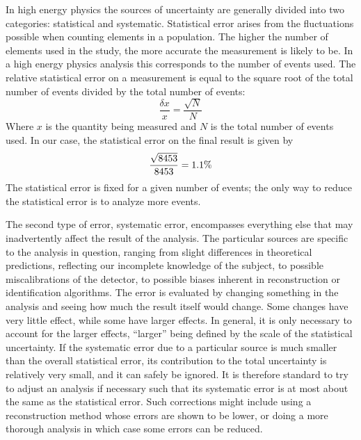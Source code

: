 In high energy physics the sources of uncertainty 
are generally divided into two categories: 
statistical and systematic.  
Statistical error arises from the fluctuations 
possible when counting elements in a population.  
The higher the number of elements used 
in the study, 
the more accurate the measurement is likely to be.  
In a high energy physics analysis 
this corresponds to the number of events used.  
The relative statistical error on a measurement 
is equal to the square root of the total number 
of events divided by the total number of events:
\[
\frac{\delta{}x}{x} = \frac{\sqrt{N}}{N}
\]
Where $x$ is the quantity being measured and 
$N$ is the total number of events used.  
In our case, the statistical error on the final 
result is given by 
\[
\frac{\sqrt{\nevents{}}}{\nevents{}} = 1.1\% %
\]
The statistical error is fixed for a given number 
of events; 
the only way to reduce the statistical error 
is to analyze more events.  

The second type of error, systematic error, 
encompasses everything else that may 
inadvertently 
affect the result of the analysis.  
The particular sources are specific to the analysis 
in question, 
ranging from slight differences 
in theoretical predictions, 
reflecting our incomplete knowledge of the subject, 
to possible miscalibrations of the detector, 
to possible biases inherent in reconstruction 
or identification algorithms.  
The error is evaluated by changing something 
in the analysis and seeing how much the 
result itself would change.  
Some changes have very little effect, 
while some have larger effects.  
In general, it is only necessary to account 
for the larger effects, 
``larger'' being defined by the scale 
of the statistical uncertainty.  
If the systematic error due to a particular 
source is much smaller than the 
overall statistical error, 
its contribution to the total uncertainty 
is relatively very small, 
and it can safely be ignored.  
It is therefore standard to try to adjust 
an analysis if necessary such that its 
systematic error is at most about the same as 
the statistical error.  
Such corrections might include using 
a reconstruction method whose errors 
are shown to be lower, 
or doing a more thorough analysis 
in which case some errors can be reduced.  





